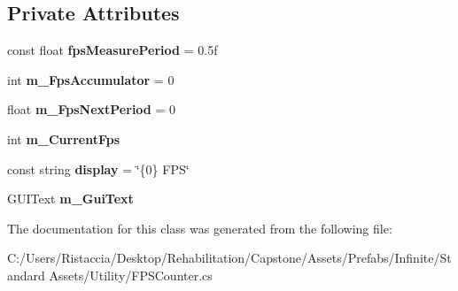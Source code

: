 \subsection*{Private Attributes}
\begin{DoxyCompactItemize}
\item 
\mbox{\label{class_unity_standard_assets_1_1_utility_1_1_f_p_s_counter_ab3cc40b16942252b82dd145888d9dc86}} 
const float {\bfseries fps\+Measure\+Period} = 0.\+5f
\item 
\mbox{\label{class_unity_standard_assets_1_1_utility_1_1_f_p_s_counter_a81ad9345584bf7cfb40076c05055e819}} 
int {\bfseries m\+\_\+\+Fps\+Accumulator} = 0
\item 
\mbox{\label{class_unity_standard_assets_1_1_utility_1_1_f_p_s_counter_a9538b516d01228cdb2a1d6bc6580d9e0}} 
float {\bfseries m\+\_\+\+Fps\+Next\+Period} = 0
\item 
\mbox{\label{class_unity_standard_assets_1_1_utility_1_1_f_p_s_counter_ae573a66adf55d4f8db97d5cd9c8591dd}} 
int {\bfseries m\+\_\+\+Current\+Fps}
\item 
\mbox{\label{class_unity_standard_assets_1_1_utility_1_1_f_p_s_counter_ae25a55bed2a737afa5f53bf2aefe9d44}} 
const string {\bfseries display} = \char`\"{}\{0\} F\+PS\char`\"{}
\item 
\mbox{\label{class_unity_standard_assets_1_1_utility_1_1_f_p_s_counter_a4d5e527c97f17121b2d35b2ed38690b6}} 
G\+U\+I\+Text {\bfseries m\+\_\+\+Gui\+Text}
\end{DoxyCompactItemize}


The documentation for this class was generated from the following file\+:\begin{DoxyCompactItemize}
\item 
C\+:/\+Users/\+Ristaccia/\+Desktop/\+Rehabilitation/\+Capstone/\+Assets/\+Prefabs/\+Infinite/\+Standard Assets/\+Utility/F\+P\+S\+Counter.\+cs\end{DoxyCompactItemize}
